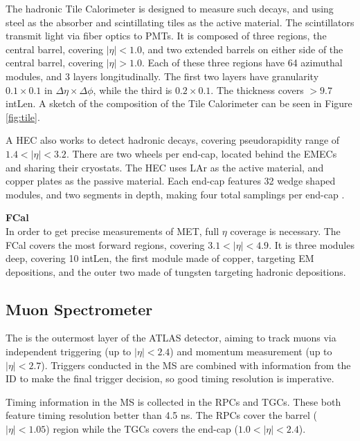\indent The hadronic Tile Calorimeter is designed to measure such decays, and using steel as the absorber and scintillating tiles as the active material. The scintillators transmit light via fiber optics to \glspl{PMT}. It is composed of three regions, the central barrel, covering $|\eta| < 1.0$, and two extended barrels on either side of the central barrel, covering $|\eta| > 1.0$. Each of these three regions have 64 azimuthal modules, and 3 layers longitudinally. The first two layers have granularity $0.1 \times 0.1$ in $\Delta\eta \times \Delta \phi$, while the third is $0.2 \times 0.1$. The thickness covers $>9.7$ \gls{intLen}. A sketch of the composition of the Tile Calorimeter can be seen in Figure \ref{fig:tile}.

A \gls{HEC} also works to detect hadronic decays, covering pseudorapidity range of $1.4 < |\eta| < 3.2$. There are two wheels per end-cap, located behind the \glspl{EMEC} and sharing their cryostats. The \gls{HEC} uses \gls{LAr} as the active material, and copper plates as the passive material. Each end-cap features 32 wedge shaped modules, and two segments in depth, making four total samplings per end-cap \cite{lar-tdr}.


\noindent\textbf{\gls{FCal}}\\
\indent In order to get precise measurements of \gls{MET}, full $\eta$ coverage is necessary. The \gls{FCal} covers the most forward regions, covering $3.1 < |\eta| < 4.9$. It is three modules deep, covering 10 \gls{intLen}, the first module made of copper, targeting \gls{EM} depositions, and the outer two made of tungsten targeting hadronic depositions.


\subsection{Muon Spectrometer} \label{ssec:muonspectrometer}
The  \cite{muon-tdr} is the outermost layer of the ATLAS detector, aiming to track muons via independent triggering (up to $|\eta| < 2.4$) and momentum measurement (up to $|\eta| < 2.7$). Triggers conducted in the \gls{MS} are combined with information from the \gls{ID} to make the final trigger decision, so good timing resolution is imperative.

Timing information in the \gls{MS} is collected in the \glspl{RPC} and \glspl{TGC}. These both feature timing resolution better than 4.5 ns. The \glspl{RPC} cover the barrel ($|\eta| < 1.05$) region while the \glspl{TGC} covers the end-cap ($1.0<|\eta|<2.4$).

